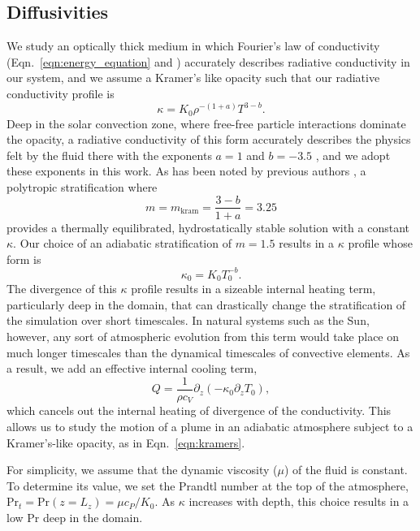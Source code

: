 \documentclass[twocolumn, amsmath, amsfonts, amssymb]{aastex62}
\begin{document}
\subsection{Diffusivities}
\label{sec:diffusivities}
We study an optically thick medium in which
Fourier's law of conductivity 
(Eqn.~\ref{eqn:energy_equation} and \cite{lecoanet&all2014}) accurately
describes radiative conductivity in our system, and we assume a Kramer's like
opacity such that our radiative conductivity profile is 
\citep{barekat&brandenburg2014, kapyla&all2017, kapyla&all2018}
\begin{equation}
\kappa = K_0 \rho^{-(1+a)}T^{3-b}.
\label{eqn:kramers}
\end{equation}
Deep in the solar convection zone, where free-free particle interactions dominate
the opacity, a radiative conductivity of this form accurately
describes the physics felt by the fluid there with the exponents $a = 1$ and
$b = -3.5$ \citep{Cox&Giuli}, and we adopt these exponents in this work. 
As has been noted by previous authors \citep{jones1976, edwards1990, barekat&brandenburg2014},
a polytropic stratification where
$$
m = m_{\text{kram}} = \frac{3-b}{1 + a} = 3.25
$$
provides a thermally equilibrated, hydrostatically stable solution with a 
constant $\kappa$. Our choice of an adiabatic stratification of
$m = 1.5$ results in a $\kappa$ profile whose form is
\begin{equation}
\kappa_0 = K_0 T_0^{-b}.
\end{equation}
The divergence of this $\kappa$ profile results in a sizeable internal heating
term, particularly deep in the domain, that can drastically change the
stratification of the simulation over short timescales. In natural systems such
as the Sun, however, any sort of atmospheric evolution from this term would
take place on much longer timescales than the dynamical timescales of convective
elements. As a result, we add an effective internal cooling term,
\begin{equation}
Q = \frac{1}{\rho c_V}\partial_z(-\kappa_0 \partial_z T_0),
\label{eqn:q_cool}
\end{equation}
which cancels out the internal heating of divergence of the conductivity. This
allows us to study the motion of a plume in an adiabatic atmosphere
subject to a Kramer's-like opacity, as in Eqn.~\ref{eqn:kramers}.

For simplicity, we assume that the dynamic viscosity ($\mu$) 
of the fluid is constant. To determine its value, we set
 the Prandtl number at the top of the atmosphere,
$\text{Pr}_t = \text{Pr}(z=L_z) = \mu c_P / K_0$. 
As $\kappa$ increases with depth, this choice
results in a low Pr deep in the domain.
\end{document}
